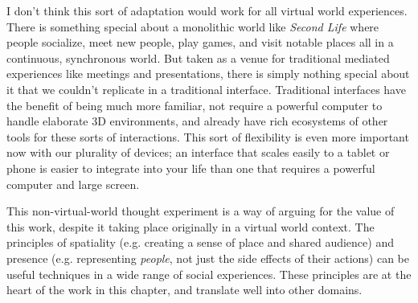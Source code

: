 I don't think this sort of adaptation would work for all virtual world experiences. There is something special about a monolithic world like \emph{Second Life} where people socialize, meet new people, play games, and visit notable places all in a continuous, synchronous world. But taken as a venue for traditional mediated experiences like meetings and presentations, there is simply nothing special about it that we couldn't replicate in a traditional interface. Traditional interfaces have the benefit of being much more familiar, not require a powerful computer to handle elaborate 3D environments, and already have rich ecosystems of other tools for these sorts of interactions. This sort of flexibility is even more important now with our plurality of devices; an interface that scales easily to a tablet or phone is easier to integrate into your life than one that requires a powerful computer and large screen. 

This non-virtual-world thought experiment is a way of arguing for the value of this work, despite it taking place originally in a virtual world context. The principles of spatiality (e.g. creating a sense of place and shared audience) and presence (e.g. representing \emph{people}, not just the side effects of their actions) can be useful techniques in a wide range of social experiences. These principles are at the heart of the work in this chapter, and translate well into other domains.





% 
% 
% 



